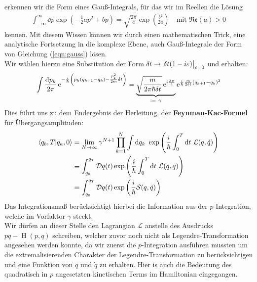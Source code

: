 erkennen wir die Form eines Gauß-Integrals, für das wir im Reellen die Lösung 
\begin{align}
	\int_{-\infty}^{\infty}\dd p \exp\left(-\frac{1}{2}a p^2 + b p\right) = \sqrt{\frac{2\pi}{a}}\exp\left(\frac{b^2}{2a}\right) \quad \text{mit } \mathfrak{Re}(a)>0 
\end{align}
kennen. Mit diesem Wissen können wir durch einen mathematischen Trick, eine analytische Fortsetzung in die komplexe Ebene, auch Gauß-Integrale der Form von Gleichung (\ref{eqn:gauss}) lösen. \\
 Wir wählen hierzu eine Substitution der Form $\delta t \rightarrow \eval{\delta t(1- i\varepsilon)}_{\varepsilon=0}$ und erhalten:
 \begin{align}
 	\int\frac{\dd p_k}{2\pi} \operatorname{e}^{-\frac{i}{\hbar}\left(p_k(q_{k+1}-q_k)-\frac{p_k^2}{2m}\delta t\right)} = \underbrace{\sqrt{\frac{m}{2\pi\hbar\delta t}}\operatorname{e}^{i\frac{3\pi}{4}}}_{:= \ \gamma} \operatorname{e}^{\frac{i}{\hbar}\frac{m}{2\delta t}(q_{k+1}-q_k)^2}
 \end{align}
 Dies führt uns zu dem Endergebnis der Herleitung, der \textbf{Feynman-Kac-Formel} für Übergangsamplituden: 
 \begin{align}
 		 \braket{q_b,T}{q_a,0} &= \lim_{N \rightarrow\infty} \gamma^{N+1}\prod_{k=1}^{N} \int\dd q_k \ \exp\left(\ihbar\int_{0}^{T}\dd t \ \mathcal{L}(q,\dot{q})\right) \nonumber \\
	 &\equiv \int_{q_0}^{q_T} \mathcal{D}q(t) \exp\left(\ihbar\int_{0}^{T}\dd t \ \mathcal{L}(q,\dot{q})\right) \nonumber \\
	 &= \int_{q_0}^{q_T} \mathcal{D}q(t) \exp\left(\ihbar \mathcal{S}(q,\dot{q})\right) \label{eqn:feynman-kac}
 \end{align}
 Das Integrationsmaß berücksichtigt hierbei die Information aus der $p$-Integration, welche im Vorfaktor $\gamma$ steckt. \\
 Wir dürfen an dieser Stelle den Lagrangian $\mathcal{L}$ anstelle des Ausdrucks \ $pq - \operatorname{H}(p,q)$ schreiben, welcher zuvor noch nicht als Legendre-Transformation angesehen werden konnte, da wir zuerst die $p$-Integration ausführen mussten um die extremalisierenden Charakter der Legendre-Transformation zu berücksichtigen  und eine Funktion von $q$ und $\dot{q}$ zu erhalten. Hier is auch die Bedeutung des quadratisch in $p$ angesetzten kinetischen Terms im Hamiltonian eingegangen. 